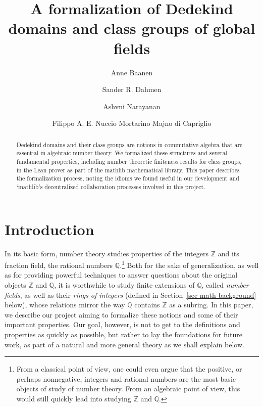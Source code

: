 \documentclass[a4paper,USenglish,cleveref, autoref, thm-restate]{lipics-v2021}
\title{A formalization of Dedekind domains and class groups of global fields}
\author{Anne Baanen}{Department of Computer Science, Vrije Universiteit Amsterdam, The Netherlands \and \url{https://cs.vu.nl/~tbn305}}{t.baanen@vu.nl}{https://orcid.org/0000-0001-8497-3683}
{NWO Vidi grant No. 016.Vidi.189.037, Lean Forward}
\author{Sander R. Dahmen}{Department of Mathematics, Vrije Universiteit Amsterdam, The Netherlands \and \url{https://few.vu.nl/~sdn249/}}{s.r.dahmen@vu.nl}{https://orcid.org/0000-0002-0014-0789}{NWO Vidi grant No. 639.032.613, New Diophantine Directions}
\author{Ashvni Narayanan}{London School of Geometry and Number Theory}{a.narayanan20@imperial.ac.uk}{orcID?}{EPSRC, UK}
\author{Filippo A. E. Nuccio Mortarino Majno di Capriglio}{Univ Lyon, Université Jean Monnet Saint-Étienne, CNRS UMR 5208, Institut Camille Jordan, F-42023 Saint-\'Etienne, France\and\url {https://perso.univ-st-etienne.fr/nf51454h/index.html}}{filippo.nuccio@univ-st-etienne.fr}{https://orcid.org/0000-0002-5318-9869}{\empty}
\newcommand{\mathlib}{\textsf{mathlib}\xspace}
\newcommand{\Q}{\mathbb{Q}}
\newcommand{\Z}{\mathbb{Z}}
\begin{document}
\maketitle

\begin{abstract}
Dedekind domains and their class groups are notions in commutative algebra that are essential in algebraic number theory.
We formalized these structures and several fundamental properties, including number theoretic finiteness results for class groups, in the Lean prover as part of the \mathlib mathematical library.
This paper describes the formalization process, noting the idioms we found useful in our development and `mathlib's decentralized collaboration processes involved in this project.
\end{abstract}

\section{Introduction}

In its basic form, number theory studies properties of the integers $\Z$
and its fraction field, the rational numbers $\Q$.\footnote{From a classical point of view, one could even argue that the positive, or perhaps nonnegative, integers and rational numbers are the most basic objects of study of number theory. From an algebraic point of view, this would still quickly lead into studying $\Z$ and $\Q$.}
Both for the sake of generalization, as well as for providing powerful techniques to answer questions about the original objects $\Z$ and $\Q$,
it is worthwhile to study finite extensions of $\Q$, called \emph{number fields}, as well as their \emph{rings of integers} (defined in Section~\ref{sec math background} below),
whose relations mirror the way $\Q$ contains $\Z$ as a subring. 
In this paper, we describe our project aiming to formalize these notions and some of their important properties.
Our goal, however, is not to get to the definitions and properties as quickly as possible,
but rather %
to lay the foundations for future work,
as part of a natural and more general theory as we shall explain below.
\end{document}
